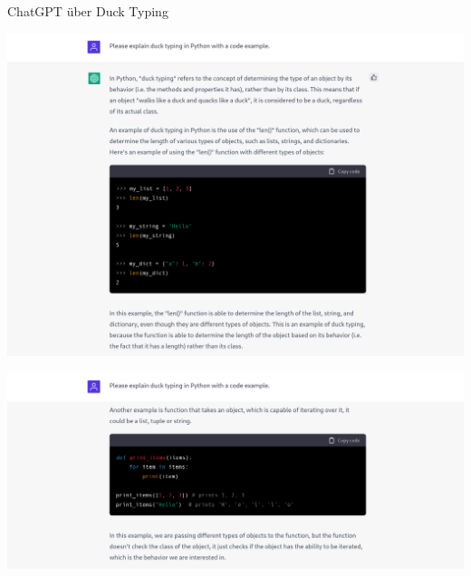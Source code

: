 
\begin{frame}[allowframebreaks]{ChatGPT über Duck Typing}
    \begin{center}
        \includegraphics[width=.9\textwidth]{img/chatgpt-ducktyping1}
    \end{center}

    \framebreak

    \begin{center}
        \includegraphics[width=.9\textwidth]{img/chatgpt-ducktyping2}
    \end{center}
\end{frame}


